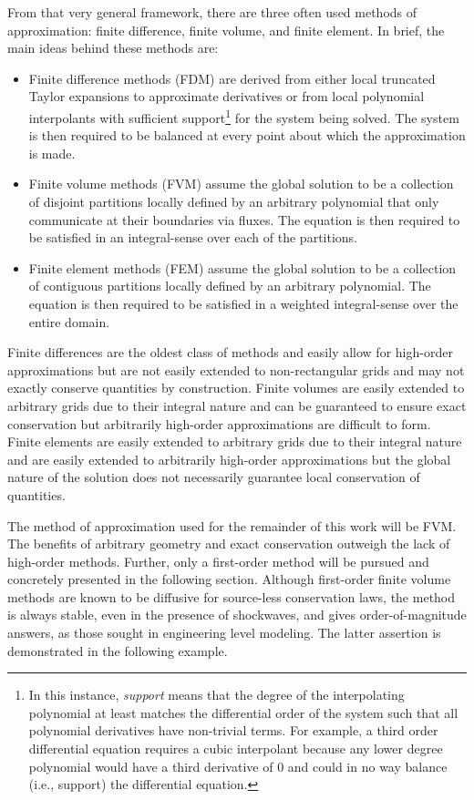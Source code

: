 \documentclass[12pt]{../UWMadThesis}
\begin{document}
From that very general framework, there are three often used methods of approximation: finite difference, finite volume, and finite element.
In brief, the main ideas behind these methods are:
\begin{itemize}[topsep=-0.5\parskip]
    \item{Finite difference methods (FDM) are derived from either local truncated Taylor expansions to approximate derivatives or from local polynomial interpolants with sufficient support\footnote{In this instance, \emph{support} means that the degree of the interpolating polynomial at least matches the differential order of the system such that all polynomial derivatives have non-trivial terms.  For example, a third order differential equation requires a cubic interpolant because any lower degree polynomial would have a third derivative of $0$ and could in no way balance (i.e., support) the differential equation.} for the system being solved. The system is then required to be balanced at every point about which the approximation is made.}
    \item{Finite volume methods (FVM) assume the global solution to be a collection of disjoint partitions locally defined by an arbitrary polynomial that only communicate at their boundaries via fluxes. The equation is then required to be satisfied in an integral-sense over each of the partitions.}
    \item{Finite element methods (FEM) assume the global solution to be a collection of contiguous partitions locally defined by an arbitrary polynomial. The equation is then required to be satisfied in a weighted integral-sense over the entire domain.}
\end{itemize}
 
Finite differences are the oldest class of methods and easily allow for high-order approximations but are not easily extended to non-rectangular grids and may not exactly conserve quantities by construction.
Finite volumes are easily extended to arbitrary grids due to their integral nature and can be guaranteed to ensure exact conservation but arbitrarily high-order approximations are difficult to form.
Finite elements are easily extended to arbitrary grids due to their integral nature and are easily extended to arbitrarily high-order approximations but the global nature of the solution does not necessarily guarantee local conservation of quantities.

The method of approximation used for the remainder of this work will be FVM.
The benefits of arbitrary geometry and exact conservation outweigh the lack of high-order methods.
Further, only a first-order method will be pursued and concretely presented in the following section.
Although first-order finite volume methods are known to be diffusive for source-less conservation laws, the method is always stable, even in the presence of shockwaves, and gives order-of-magnitude answers, as those sought in engineering level modeling.
The latter assertion is demonstrated in the following example.
\end{document}
